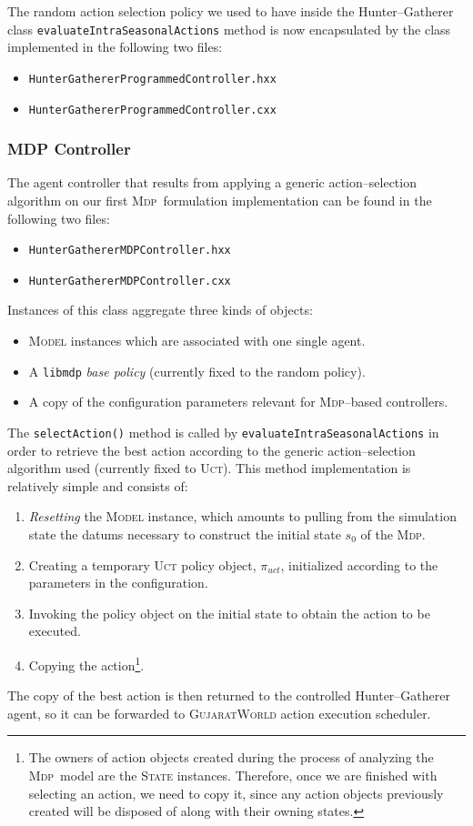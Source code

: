 \documentclass[a4paper,10pt]{article}
\newcommand{\mdp}{\textsc{Mdp}}
\begin{document}
The random action selection policy we used to have inside the Hunter--Gatherer class \texttt{evaluateIntraSeasonalActions}
method is now encapsulated by the class implemented in the following two files:

\begin{itemize}
\item \texttt{HunterGathererProgrammedController.hxx}
\item \texttt{HunterGathererProgrammedController.cxx}
\end{itemize}

\subsubsection{MDP Controller}

The agent controller that results from applying a generic action--selection algorithm on our first \mdp~formulation 
implementation can be found in the following two files:

\begin{itemize}
\item \texttt{HunterGathererMDPController.hxx}
\item \texttt{HunterGathererMDPController.cxx}
\end{itemize}

Instances of this class aggregate three kinds of objects:
\begin{itemize}
\item \textsc{Model} instances which are associated with one single agent.
\item A \texttt{libmdp} \emph{base policy} (currently fixed to the random policy).
\item A copy of the configuration parameters relevant for \mdp--based controllers.
\end{itemize}
The \texttt{selectAction()} method is called by \texttt{evaluateIntraSeasonalActions} in order to retrieve
the best action according to the generic action--selection algorithm used (currently fixed to \textsc{Uct}). This method
implementation is relatively simple and consists of:
\begin{enumerate}
\item \emph{Resetting} the \textsc{Model} instance, which amounts to pulling from the simulation state the datums necessary
to construct the initial state $s_0$ of the \mdp.
\item Creating a temporary \textsc{Uct} policy object, $\pi_{uct}$, initialized according to the parameters in the configuration.
\item Invoking the policy object on the initial state to obtain the action to be executed.
\item Copying the action\footnote{The owners of action objects created during the process of analyzing the \mdp~model
are the \textsc{State} instances. Therefore, once we are finished with selecting an action, we need to copy it, since
any action objects previously created will be disposed of along with their owning states.}.
\end{enumerate}
The copy of the best action is then returned to the controlled Hunter--Gatherer agent, so it can be forwarded to 
\textsc{GujaratWorld} action execution scheduler.
\end{document}
